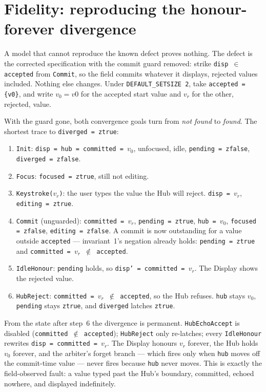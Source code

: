 \documentclass[a4paper,10pt,fleqn]{article}
\begin{document}
\section{Fidelity: reproducing the honour-forever divergence}
\label{sec:fidelity}

A model that cannot reproduce the known defect proves nothing.  The defect is the
corrected specification with the commit guard removed: strike
\texttt{disp $\in$ accepted} from \texttt{Commit}, so the field commits whatever it
displays, rejected values included.  Nothing else changes.  Under
\texttt{DEFAULT\_SETSIZE 2}, take \texttt{accepted = \{v0\}}, and write $v_0 = v0$
for the accepted start value and $v_r$ for the other, rejected, value.

With the guard gone, both convergence goals turn from \emph{not found} to
\emph{found}.  The shortest trace to \texttt{diverged = ztrue}:
\begin{enumerate}
  \item \texttt{Init}: \texttt{disp = hub = committed = $v_0$}, unfocused, idle,
    \texttt{pending = zfalse}, \texttt{diverged = zfalse}.
  \item \texttt{Focus}: \texttt{focused = ztrue}, still not editing.
  \item \texttt{Keystroke($v_r$)}: the user types the value the Hub will reject.
    \texttt{disp = $v_r$}, \texttt{editing = ztrue}.
  \item \texttt{Commit} (unguarded): \texttt{committed = $v_r$},
    \texttt{pending = ztrue}, \texttt{hub = $v_0$}, \texttt{focused = zfalse},
    \texttt{editing = zfalse}.  A commit is now outstanding for a value outside
    \texttt{accepted} --- invariant~1's negation already holds:
    \texttt{pending = ztrue} and \texttt{committed = $v_r$ $\notin$ accepted}.
  \item \texttt{IdleHonour}: \texttt{pending} holds, so \texttt{disp' = committed
    = $v_r$}.  The Display shows the rejected value.
  \item \texttt{HubReject}: \texttt{committed = $v_r$ $\notin$ accepted}, so the
    Hub refuses.  \texttt{hub} stays $v_0$, \texttt{pending} stays \texttt{ztrue},
    and \texttt{diverged} latches \texttt{ztrue}.
\end{enumerate}
From the state after step~6 the divergence is permanent.  \texttt{HubEchoAccept}
is disabled (\texttt{committed $\notin$ accepted}); \texttt{HubReject} only
re-latches; every \texttt{IdleHonour} rewrites \texttt{disp = committed = $v_r$}.
The Display honours $v_r$ forever, the Hub holds $v_0$ forever, and the arbiter's
forget branch --- which fires only when \texttt{hub} moves off the commit-time
value --- never fires because \texttt{hub} never moves.  This is exactly the
field-observed fault: a value typed past the Hub's boundary, committed, echoed
nowhere, and displayed indefinitely.
\end{document}
